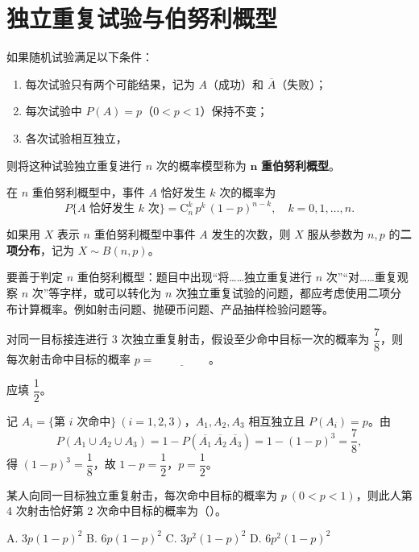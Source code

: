\documentclass[lang=cn,11pt]{elegantbook}
\begin{document}
\section{独立重复试验与伯努利概型}

\begin{definition}[\(n\) 重伯努利概型] \label{def:bernoulli}
如果随机试验满足以下条件：
\begin{enumerate}
    \item 每次试验只有两个可能结果，记为 \(A\)（成功）和 \(\overline{A}\)（失败）；
    \item 每次试验中 \(P(A)=p\)（\(0 < p < 1\)）保持不变；
    \item 各次试验相互独立，
\end{enumerate}
则将这种试验独立重复进行 \(n\) 次的概率模型称为 \(\boldsymbol{n}\) \textbf{重伯努利概型}。
\end{definition}

在 \(n\) 重伯努利概型中，事件 \(A\) 恰好发生 \(k\) 次的概率为
\[
P\{A \text{ 恰好发生 } k \text{ 次}\} = \mathrm{C}_n^k\, p^k\, (1-p)^{n-k}, \quad k=0,1,\dots,n.
\]

如果用 \(X\) 表示 \(n\) 重伯努利概型中事件 \(A\) 发生的次数，则 \(X\) 服从参数为 \(n, p\) 的\textbf{二项分布}，记为 \(X \sim B(n,p)\)。

\begin{note}
要善于判定 \(n\) 重伯努利概型：题目中出现“将……独立重复进行 \(n\) 次”“对……重复观察 \(n\) 次”等字样，或可以转化为 \(n\) 次独立重复试验的问题，都应考虑使用二项分布计算概率。例如射击问题、抛硬币问题、产品抽样检验问题等。
\end{note}

\begin{exercise}\label{exer:1-19}
对同一目标接连进行 3 次独立重复射击，假设至少命中目标一次的概率为 \(\dfrac{7}{8}\)，则每次射击命中目标的概率 \(p=\underline{\hspace{2cm}}\)。
\end{exercise}

\begin{solution}
应填 \(\dfrac{1}{2}\)。

记 \(A_i=\{\text{第 }i\text{ 次命中}\}\ (i=1,2,3)\)，\(A_1, A_2, A_3\) 相互独立且 \(P(A_i)=p\)。由
\[
P(A_1 \cup A_2 \cup A_3) = 1 - P(\overline{A_1}\,\overline{A_2}\,\overline{A_3}) = 1 - (1-p)^3 = \frac{7}{8},
\]
得 \((1-p)^3 = \dfrac{1}{8}\)，故 \(1-p = \dfrac{1}{2}\)，\(p = \dfrac{1}{2}\)。
\end{solution}

\begin{exercise}\label{exer:1-20}
某人向同一目标独立重复射击，每次命中目标的概率为 \(p\ (0<p<1)\)，则此人第 4 次射击恰好第 2 次命中目标的概率为（\quad）。\par
A. \(3p(1-p)^2\)\quad
B. \(6p(1-p)^2\)\quad
C. \(3p^2(1-p)^2\)\quad
D. \(6p^2(1-p)^2\)
\end{exercise}
\end{document}
